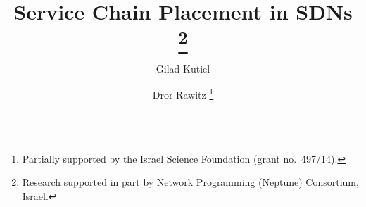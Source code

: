 \documentclass[runningheads]{llncs}
\begin{document}
\title{\bf Service Chain Placement in SDNs%
\thanks{Research supported in part by Network Programming (Neptune)
  Consortium, Israel.}
}






\author{%
Gilad Kutiel
\and
Dror Rawitz%
\thanks{Partially supported by the Israel Science Foundation
  (grant no.~497/14).  }
}


\maketitle
\end{document}
